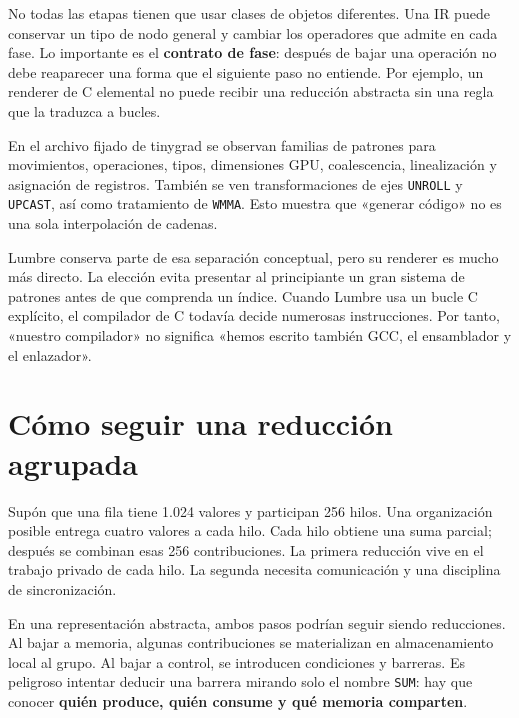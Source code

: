 \documentclass[12pt,a4paper,oneside]{report}
\begin{document}
\begin{center}
\end{center}
No todas las etapas tienen que usar clases de objetos diferentes. Una IR puede conservar un tipo de nodo general y cambiar los operadores que admite en cada fase. Lo importante es el \textbf{contrato de fase}: después de bajar una operación no debe reaparecer una forma que el siguiente paso no entiende. Por ejemplo, un renderer de C elemental no puede recibir una reducción abstracta sin una regla que la traduzca a bucles.

En el archivo fijado de tinygrad se observan familias de patrones para movimientos, operaciones, tipos, dimensiones GPU, coalescencia, linealización y asignación de registros. También se ven transformaciones de ejes \texttt{UNROLL} y \texttt{UPCAST}, así como tratamiento de \texttt{WMMA}. Esto muestra que «generar código» no es una sola interpolación de cadenas. \cite{tinygrad-codegen}

Lumbre conserva parte de esa separación conceptual, pero su renderer es mucho más directo. La elección evita presentar al principiante un gran sistema de patrones antes de que comprenda un índice. Cuando Lumbre usa un bucle C explícito, el compilador de C todavía decide numerosas instrucciones. Por tanto, «nuestro compilador» no significa «hemos escrito también GCC, el ensamblador y el enlazador».

\section{Cómo seguir una reducción agrupada}
Supón que una fila tiene 1.024 valores y participan 256 hilos. Una organización posible entrega cuatro valores a cada hilo. Cada hilo obtiene una suma parcial; después se combinan esas 256 contribuciones. La primera reducción vive en el trabajo privado de cada hilo. La segunda necesita comunicación y una disciplina de sincronización.

En una representación abstracta, ambos pasos podrían seguir siendo reducciones. Al bajar a memoria, algunas contribuciones se materializan en almacenamiento local al grupo. Al bajar a control, se introducen condiciones y barreras. Es peligroso intentar deducir una barrera mirando solo el nombre \texttt{SUM}: hay que conocer \textbf{quién produce, quién consume y qué memoria comparten}.
\end{document}

